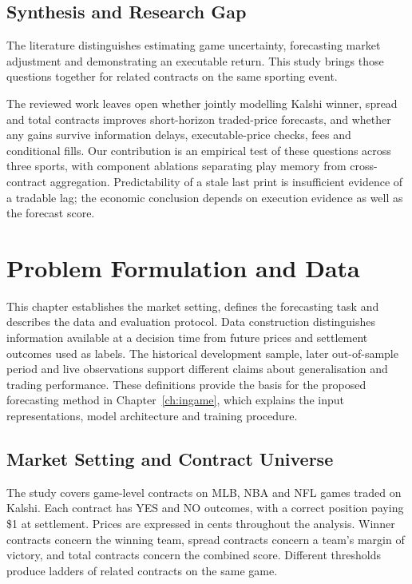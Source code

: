 \documentclass[12pt,a4paper,oneside]{report}
\begin{document}
\section{Synthesis and Research Gap}
The literature distinguishes estimating game uncertainty, forecasting market
adjustment and demonstrating an executable return. This study brings those
questions together for related contracts on the same sporting event.

The reviewed work leaves open whether jointly modelling Kalshi winner, spread
and total contracts improves short-horizon traded-price forecasts, and whether
any gains survive information delays, executable-price checks, fees and
conditional fills. Our contribution is an empirical test of these questions
across three sports, with component ablations separating play memory from
cross-contract aggregation. Predictability of a stale last print is insufficient
evidence of a tradable lag; the economic conclusion depends on execution
evidence as well as the forecast score.

\chapter{Problem Formulation and Data}
\label{ch:data}
This chapter establishes the market setting, defines the forecasting task and
describes the data and evaluation protocol. Data construction distinguishes
information available at a decision time from future prices and settlement
outcomes used as labels. The historical development sample, later out-of-sample period and live
observations support different claims about generalisation and trading
performance. These definitions provide the basis for the proposed forecasting
method in Chapter~\ref{ch:ingame}, which explains the input representations,
model architecture and training procedure.

\section{Market Setting and Contract Universe}\label{sec:kalshi}
The study covers game-level contracts on MLB, NBA and NFL games traded on Kalshi.
Each contract has YES and NO outcomes, with a correct position paying \$1 at
settlement. Prices are expressed in cents throughout the analysis. Winner
contracts concern the winning team, spread contracts concern a team's margin of
victory, and total contracts concern the combined score. Different thresholds
produce ladders of related contracts on the same game.
\end{document}
